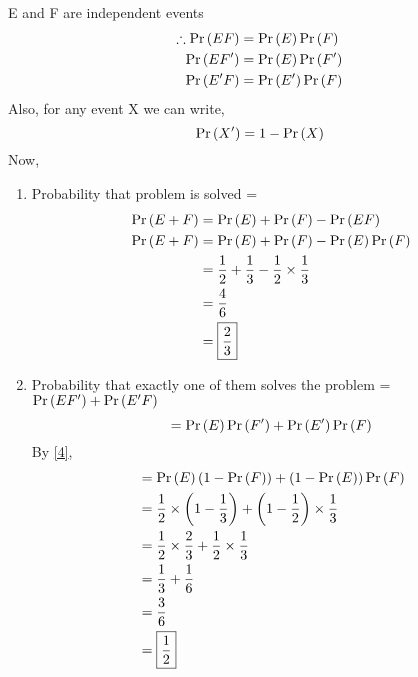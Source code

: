 \documentclass[journal,12pt,two column]{IEEEtran}
\begin{document}
E and F are independent events
\begin{align}
    \therefore \Pr\left(EF\right) &= \Pr\left(E\right)\Pr\left(F\right) \\
               \Pr\left(EF'\right) &= \Pr\left(E\right)\Pr\left(F'\right) \\
               \Pr\left(E'F\right) &= \Pr\left(E'\right)\Pr\left(F\right) 
\end{align}
Also, for any event X we can write,
\begin{equation}
    \Pr\left(X'\right) = 1 - \Pr\left(X\right) \label{4}
\end{equation}
Now,
\begin{enumerate}[label = (\roman*)]
       \item Probability that problem is solved = 
        \begin{align}
         \Pr\left(E + F\right) &= \Pr\left(E\right) + \Pr\left(F\right) - \Pr\left(EF\right)\\
         \Pr\left(E + F\right) &= \Pr\left(E\right) + \Pr\left(F\right) - \Pr\left(E\right)\Pr\left(F\right) \\
                    &= \frac{1}{2} + \frac{1}{3} - \frac{1}{2}\times\frac{1}{3}\\
                    &= \frac{4}{6} \\
                    &= \boxed{\frac{2}{3}}
    \end{align}
    \item Probability that exactly one of them solves the problem =
    $\Pr\left(EF'\right) + \Pr\left(E'F\right) $
    \begin{equation}
        = \Pr\left(E\right)\Pr\left(F'\right) + \Pr\left(E'\right)\Pr\left(F\right)
    \end{equation}
    By \eqref{4},
    \begin{align}
        &= \Pr\left(E\right)\left(1-\Pr\left(F\right)\right) + \left(1-\Pr\left(E\right)\right)\Pr\left(F\right) \\
        &= \frac{1}{2}\times\left(1-\frac{1}{3}\right) +\left(1-\frac{1}{2}\right)\times \frac{1}{3} \\
        &= \frac{1}{2}\times\frac{2}{3} + \frac{1}{2}\times\frac{1}{3} \\
        &= \frac{1}{3} + \frac{1}{6} \\
        &= \frac{3}{6}\\
        &= \boxed{\frac{1}{2}}
    \end{align}
    
\end{enumerate}
\end{document}
